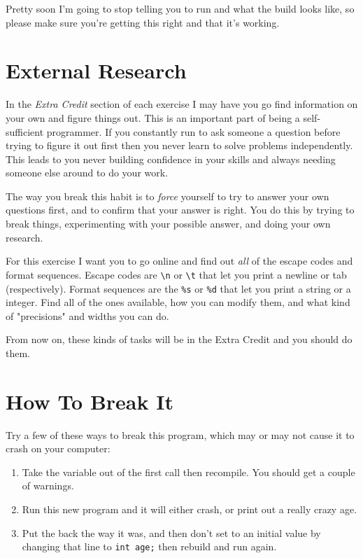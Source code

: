 Pretty soon I'm going to stop telling you to run  and what
the build looks like, so please make sure you're getting this right
and that it's working.

\section{External Research}

In the \emph{Extra Credit} section of each exercise I may have you go
find information on your own and figure things out.  This is an important
part of being a self-sufficient programmer.  If you constantly run to
ask someone a question before trying to figure it out first then you
never learn to solve problems independently.  This leads to you never
building confidence in your skills and always needing someone else
around to do your work.

The way you break this habit is to \emph{force} yourself to try to answer
your own questions first, and to confirm that your answer is right.  You
do this by trying to break things, experimenting with your possible answer,
and doing your own research.

For this exercise I want you to go online and find out \emph{all} of the
 escape codes and format sequences.  Escape codes are 
\verb|\n| or \verb|\t| that let you print a newline or tab (respectively).
Format sequences are the \verb|%s| or \verb|%d| that let you print a 
string or a integer.  Find all of the ones available, how you can
modify them, and what kind of "precisions" and widths you can do.

From now on, these kinds of tasks will be in the Extra Credit and you
should do them.

\section{How To Break It}

Try a few of these ways to break this program, which may or may
not cause it to crash on your computer:

\begin{enumerate}
\item Take the  variable out of the first  call
    then recompile. You should get a couple of warnings.
\item Run this new program and it will either crash, or print out a really
    crazy age.
\item Put the  back the way it was, and then don't set 
    to an initial value by changing that line to \verb|int age;| then
    rebuild and run again.
\end{enumerate}


